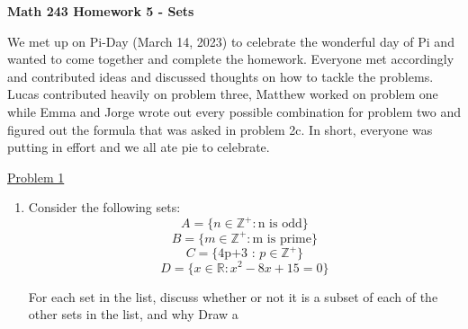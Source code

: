 \documentclass{article}
\newcommand{\R}{\mathbb{R}}
\newcommand{\Z}{\mathbb{Z}}
\begin{document}
\noindent\textbf{Math 243 \hfill Homework 5 - Sets}

We met up on Pi-Day (March 14, 2023) to celebrate 
the wonderful day of Pi and wanted to come together and 
complete the homework. Everyone met accordingly and 
contributed ideas and discussed thoughts on how to tackle 
the problems. Lucas contributed heavily on problem three, 
Matthew worked on problem one while Emma and Jorge wrote 
out every possible combination for problem two and figured 
out the formula that was asked in problem 2c. In short, 
everyone was putting in effort and we all ate pie to 
celebrate. 

\pagebreak

\underline{Problem 1}

\begin{enumerate}
    \item Consider the following sets:
$$A = \{n \in \Z^+ : \text{n is odd}\}$$
$$B = \{m\in\Z^+:\text{m is prime}\}$$
$$C = \{\text{4p+3 : }p\in\Z^+\}$$
$$D = \{x\in\R: x^2-8x+15=0 \}$$

For each set in the list, discuss whether or not it is a subset of each of the other sets in the list, and why Draw a

\end{enumerate}
\end{document}

